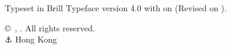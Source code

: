 \thispagestyle{empty}
\vspace*{\fill}
\begin{center}
{\small Typeset in Brill Typeface version 4.0 with  on  (Revised on ).\par}
\vspace{0.5ex}
\makeatletter
{\small \copyright\ \theauthor, \@dtm@ini@year. All rights reserved. \\ ⚓ Hong Kong} 
\makeatother
\vspace{-2.75ex}
\end{center}

